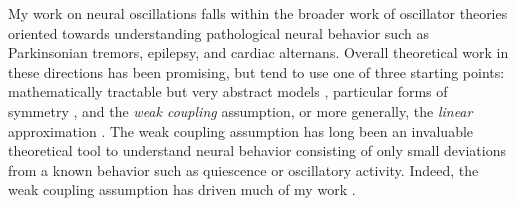 \documentclass[a4paper,11pt]{article}
\begin{document}
% 
% 
% 
%


My work on neural oscillations falls within the broader work of oscillator theories oriented towards understanding pathological neural behavior such as Parkinsonian tremors, epilepsy, and cardiac alternans. Overall theoretical work in these directions has been promising, but tend to use one of three starting points: mathematically tractable but very abstract models \cite{ott2008low}, particular forms of symmetry \cite{golubitsky1986hopf}, and the \textit{weak coupling} assumption, or more generally, the \textit{linear} approximation \cite{ermentrout2002modeling}. The weak coupling assumption has long been an invaluable theoretical tool to understand neural behavior consisting of only small deviations from a known behavior such as quiescence or oscillatory activity. Indeed, the weak coupling assumption has driven much of my work \cite{park2016weakly,park2018multiple,park2018scalar}. 
\end{document}
